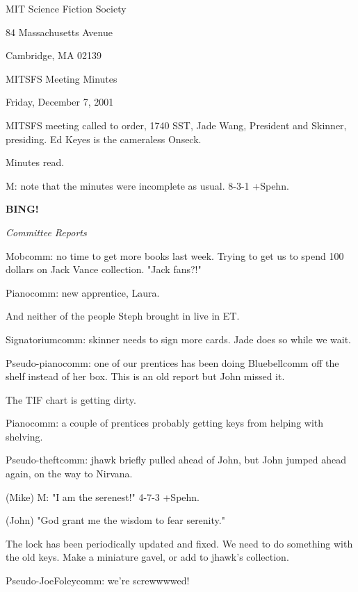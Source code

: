 \documentclass[12pt]{article}
\newcommand{\bing}{{\bf BING!} }
\newcommand{\goto}[1]{\bing \vskip 12pt \centerline{{\em{#1}}}}
\begin{document}
\begin{center}

MIT Science Fiction Society 

84 Massachusetts Avenue

Cambridge, MA 02139

\vspace{12pt}

MITSFS Meeting Minutes 

Friday, December 7, 2001

\end{center}
 
\vspace{18pt}

\setlength{\parskip}{6pt}

\noindent
MITSFS meeting called to order, 1740 SST, Jade Wang, President and Skinner, presiding.  Ed Keyes is the cameraless Onseck.

Minutes read.

M: note that the minutes were incomplete as usual. 8-3-1 +Spehn.

\goto{Committee Reports}

Mobcomm: no time to get more books last week. Trying to get us to spend 100 dollars on Jack Vance collection. "Jack fans?!"

Pianocomm: new apprentice, Laura.

And neither of the people Steph brought in live in ET.

Signatoriumcomm: skinner needs to sign more cards. Jade does so while we wait.

Pseudo-pianocomm: one of our prentices has been doing Bluebellcomm off the shelf instead of her box. This is an old report but John missed it.

The TIF chart is getting dirty.

Pianocomm: a couple of prentices probably getting keys from helping with shelving.

Pseudo-theftcomm: jhawk briefly pulled ahead of John, but John jumped ahead again, on the way to Nirvana.

(Mike) M: "I am the serenest!" 4-7-3 +Spehn.

(John) "God grant me the wisdom to fear serenity."

The lock has been periodically updated and fixed. We need to do something with the old keys. Make a miniature gavel, or add to jhawk's collection.

Pseudo-JoeFoleycomm: we're screwwwwed!
\end{document}
